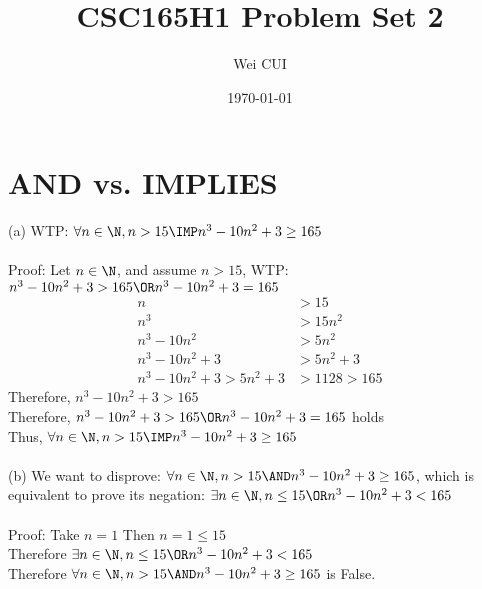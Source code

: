 \documentclass[12pt]{article}
\title{CSC165H1
Problem Set 2}
\author{Wei CUI}
\date{\today}
\begin{document}
\maketitle
\section{AND vs. IMPLIES}
(a) WTP: $\forall n \in \N, n > 15 \IMP n^3 - 10n^2 + 3 \ge 165$\\
\\
Proof: Let $n \in \N$, and assume $n > 15$, WTP:$n^3 - 10n^2 + 3 > 165 \OR n^3 - 10n^2 + 3 = 165$
\begin{align*}
    \tag{by assumption}
    n &> 15\\
    \tag{since $n > 15$, then $n^2 > 0$}
    n^3 &> 15n^2\\
    n^3 - 10n^2 &> 5n^2\\
    n^3 - 10n^2 + 3 &> 5n^2 + 3\\
    \tag{since $n > 15$, then $5n^2 + 3 > 1128$}
    n^3 - 10n^2 + 3 > 5n^2 + 3 &> 1128 > 165
\end{align*}
Therefore, $n^3 - 10n^2 + 3 > 165$\\
Therefore, $n^3 - 10n^2 + 3 > 165 \OR n^3 - 10n^2 + 3 = 165$ holds\\
Thus, $\forall n \in \N, n > 15 \IMP n^3 - 10n^2 + 3 \ge 165$\\
\\
(b) We want to disprove: $\forall n \in \N, n > 15 \AND n^3 - 10n^2 + 3 \ge 165$, which is equivalent to prove its negation: $\exists n \in \N, n \le 15 \OR n^3 -10n^2 + 3 < 165$\\
\\
Proof: Take $n = 1$ Then $n = 1 \le 15$\\
Therefore $\exists n \in \N, n \le 15 \OR n^3 -10n^2 + 3 < 165$\\
Therefore $\forall n \in \N, n > 15 \AND n^3 - 10n^2 + 3 \ge 165$ is False.
\end{document}
